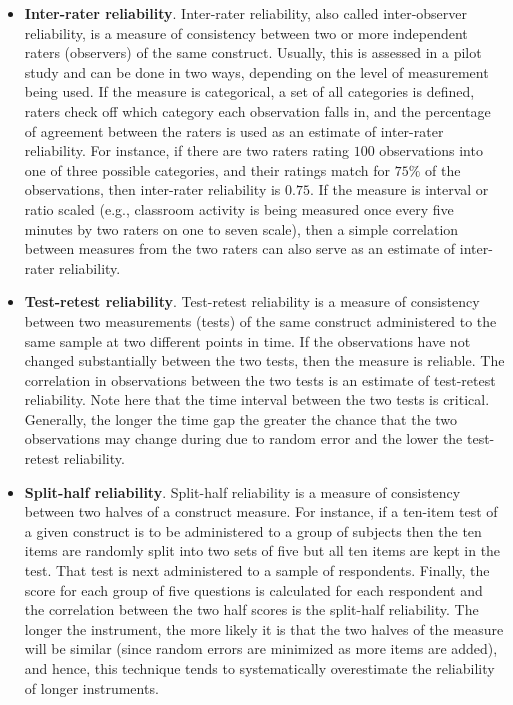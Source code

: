\begin{itemize}
	\item \textbf{Inter-rater reliability}. Inter-rater reliability, also called inter-observer reliability, is a measure of consistency between two or more independent raters (observers) of the same construct. Usually, this is assessed in a pilot study and can be done in two ways, depending on the level of measurement being used. If the measure is categorical, a set of all categories is defined, raters check off which category each observation falls in, and the percentage of agreement between the raters is used as an estimate of inter-rater reliability. For instance, if there are two raters rating $ 100 $ observations into one of three possible categories, and their ratings match for $ 75\% $ of the observations, then inter-rater reliability is $ 0.75 $. If the measure is interval or ratio scaled (e.g., classroom activity is being measured once every five minutes by two raters on one to seven scale), then a simple correlation between measures from the two raters can also serve as an estimate of inter-rater reliability.

	\item \textbf{Test-retest reliability}. Test-retest reliability is a measure of consistency between two measurements (tests) of the same construct administered to the same sample at two different points in time. If the observations have not changed substantially between the two tests, then the measure is reliable. The correlation in observations between the two tests is an estimate of test-retest reliability. Note here that the time interval between the two tests is critical. Generally, the longer the time gap the greater the chance that the two observations may change during due to random error and the lower the test-retest reliability.

	\item \textbf{Split-half reliability}. Split-half reliability is a measure of consistency between two halves of a construct measure. For instance, if a ten-item test of a given construct is to be administered to a group of subjects then the ten items are randomly split into two sets of five but all ten items are kept in the test. That test is next administered to a sample of respondents. Finally, the score for each group of five questions is calculated for each respondent and the correlation between the two half scores is the split-half reliability. The longer the instrument, the more likely it is that the two halves of the measure will be similar (since random errors are minimized as more items are added), and hence, this technique tends to systematically overestimate the reliability of longer instruments.


\end{itemize}

